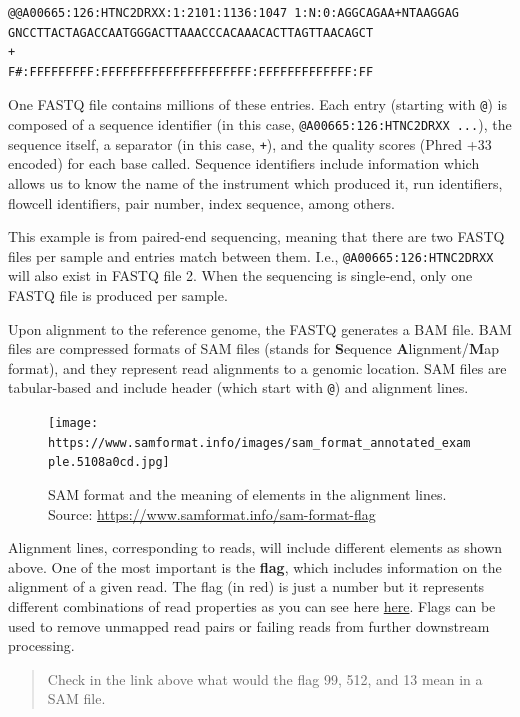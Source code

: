 \documentclass[
]{book}
\begin{document}
\begin{verbatim}
@@A00665:126:HTNC2DRXX:1:2101:1136:1047 1:N:0:AGGCAGAA+NTAAGGAG
GNCCTTACTAGACCAATGGGACTTAAACCCACAAACACTTAGTTAACAGCT
+
F#:FFFFFFFFF:FFFFFFFFFFFFFFFFFFFFF:FFFFFFFFFFFFF:FF
\end{verbatim}

One FASTQ file contains millions of these entries. Each entry (starting with \texttt{@}) is composed of a sequence identifier (in this case, \texttt{@A00665:126:HTNC2DRXX\ ...}), the sequence itself, a separator (in this case, \texttt{+}), and the quality scores (Phred +33 encoded) for each base called. Sequence identifiers include information which allows us to know the name of the instrument which produced it, run identifiers, flowcell identifiers, pair number, index sequence, among others.

This example is from paired-end sequencing, meaning that there are two FASTQ files per sample and entries match between them. I.e., \texttt{@A00665:126:HTNC2DRXX} will also exist in FASTQ file 2. When the sequencing is single-end, only one FASTQ file is produced per sample.

Upon alignment to the reference genome, the FASTQ generates a BAM file. BAM files are compressed formats of SAM files (stands for \textbf{S}equence \textbf{A}lignment/\textbf{M}ap format), and they represent read alignments to a genomic location. SAM files are tabular-based and include header (which start with \texttt{@}) and alignment lines.

\begin{figure}
\centering
\texttt{[image: https://www.samformat.info/images/sam\_format\_annotated\_example.5108a0cd.jpg]}
\caption{SAM format and the meaning of elements in the alignment lines. Source: \url{https://www.samformat.info/sam-format-flag}}
\end{figure}

Alignment lines, corresponding to reads, will include different elements as shown above. One of the most important is the \textbf{flag}, which includes information on the alignment of a given read. The flag (in red) is just a number but it represents different combinations of read properties as you can see here \href{https://broadinstitute.github.io/picard/explain-flags.html}{here}. Flags can be used to remove unmapped read pairs or failing reads from further downstream processing.

\begin{quote}
Check in the link above what would the flag 99, 512, and 13 mean in a SAM file.
\end{quote}
\end{document}
